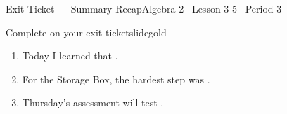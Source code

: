 \documentclass[aspectratio=169, 11pt]{beamer}
\begin{document}
\begin{frame}{Exit Ticket --- Summary Recap}{Algebra 2 \textperiodcentered\ Lesson 3-5 \textperiodcentered\ Period 3}
\vspace{0.2cm}
\begin{projcard}{Complete on your exit ticket}{slidegold}
\begin{enumerate}
  \setlength{\itemsep}{0.2cm}
  \item Today I learned that \underline{\hspace{5cm}}.
  \item For the Storage Box, the hardest step was \underline{\hspace{4.5cm}}.
  \item Thursday's assessment will test \underline{\hspace{4.5cm}}.
\end{enumerate}
\end{projcard}
\end{frame}
\end{document}

